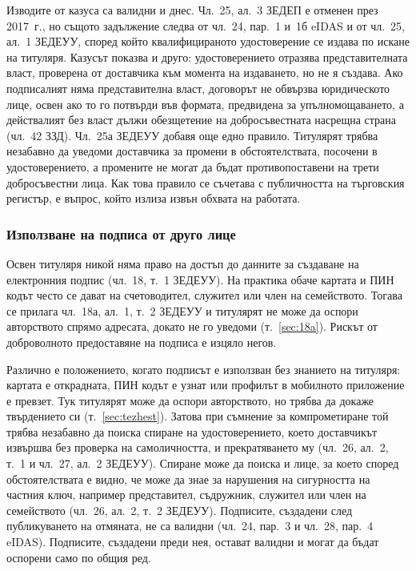 Изводите от казуса са валидни и днес. Чл.~25, ал.~3 ЗЕДЕП е отменен през 2017~г., но
същото задължение следва от чл.~24, пар.~1 и~1б eIDAS и от чл.~25, ал.~1 ЗЕДЕУУ, според
който квалифицираното удостоверение се издава по искане на титуляря. Казусът показва и
друго: удостоверението отразява представителната власт, проверена от доставчика към
момента на издаването, но не я създава. Ако подписалият няма представителна власт,
договорът не обвързва юридическото лице, освен ако то го потвърди във формата, предвидена
за упълномощаването, а действалият без власт дължи обезщетение на добросъвестната
насрещна страна (чл.~42 ЗЗД). Чл.~25а ЗЕДЕУУ добавя още едно правило. Титулярят трябва
незабавно да уведоми доставчика за промени в обстоятелствата, посочени в удостоверението,
а промените не могат да бъдат противопоставени на трети добросъвестни лица. Как това
правило се съчетава с публичността на търговския регистър, е въпрос, който излиза извън
обхвата на работата.

\subsubsection{Използване на подписа от друго лице}
\label{sec:drugo-lice}

Освен титуляря никой няма право на достъп до данните за създаване на електронния подпис
(чл.~18, т.~1 ЗЕДЕУУ). На практика обаче картата и ПИН кодът често се дават на
счетоводител, служител или член на семейството. Тогава се прилага чл.~18а, ал.~1, т.~2
ЗЕДЕУУ и титулярят не може да оспори авторството спрямо адресата, докато не го уведоми
(т.~\ref{sec:18a}). Рискът от доброволното предоставяне на подписа е изцяло негов.

Различно е положението, когато подписът е използван без знанието на титуляря: картата е
открадната, ПИН кодът е узнат или профилът в мобилното приложение е превзет. Тук
титулярят може да оспори авторството, но трябва да докаже твърдението си
(т.~\ref{sec:tezhest}). Затова при съмнение за компрометиране той трябва незабавно да
поиска спиране на удостоверението, което доставчикът извършва без проверка на
самоличността, и прекратяването му (чл.~26, ал.~2, т.~1 и чл.~27, ал.~2 ЗЕДЕУУ). Спиране
може да поиска и лице, за което според обстоятелствата е видно, че може да знае за
нарушения на сигурността на частния ключ, например представител, съдружник, служител или
член на семейството (чл.~26, ал.~2, т.~2 ЗЕДЕУУ). Подписите, създадени след публикуването
на отмяната, не са валидни (чл.~24, пар.~3 и чл.~28, пар.~4 eIDAS). Подписите, създадени
преди нея, остават валидни и могат да бъдат оспорени само по общия ред.

